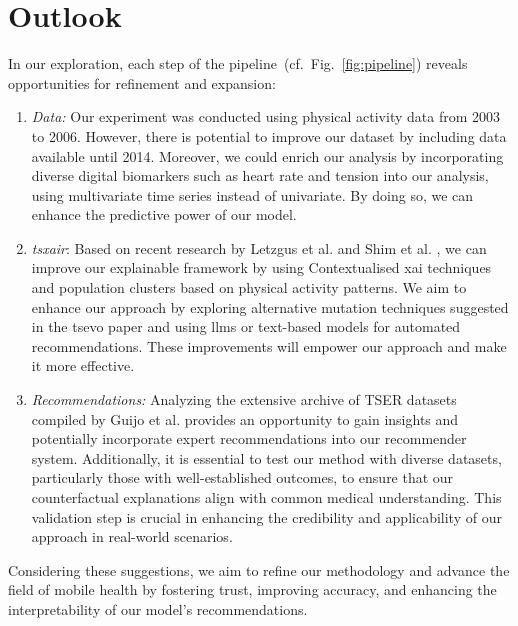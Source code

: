 \section{Outlook}
\label{sec:outlook}
In our exploration, each step of the pipeline~(cf.~Fig.~\ref{fig:pipeline}) reveals opportunities for refinement and expansion:
\begin{enumerate}

 \item \textit{Data:} Our experiment was conducted using physical activity data from 2003 to 2006. However, there is potential to improve our dataset by including data available until 2014. Moreover, we could enrich our analysis by incorporating diverse digital biomarkers such as heart rate and tension into our analysis, using multivariate time series instead of univariate. By doing so, we can enhance the predictive power of our model.
 \item \textit{\gls{tsxair}}: Based on recent research by Letzgus et al. \cite{letzgus_toward_2022} and Shim et al. \cite{shim_wearable-based_2023}, we can improve our explainable framework by using Contextualised \gls{xai} techniques and population clusters based on physical activity patterns. We aim to enhance our approach by exploring alternative mutation techniques suggested in the \gls{tsevo} paper and using \gls{llm}s or text-based models for automated recommendations. These improvements will empower our approach and make it more effective.
 \item \textit{Recommendations:} Analyzing the extensive archive of TSER datasets compiled by Guijo et al. \cite{guijo-rubio_unsupervised_2023} provides an opportunity to gain insights and potentially incorporate expert recommendations into our recommender system. Additionally, it is essential to test our method with diverse datasets, particularly those with well-established outcomes, to ensure that our counterfactual explanations align with common medical understanding. This validation step is crucial in enhancing the credibility and applicability of our approach in real-world scenarios.
\end{enumerate}
Considering these suggestions, we aim to refine our methodology and advance the field of mobile health by fostering trust, improving accuracy, and enhancing the interpretability of our model's recommendations.